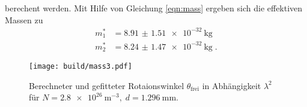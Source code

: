 berechent werden.
Mit Hilfe von Gleichung \eqref{eqn:mass} ergeben sich die effektiven Massen zu
\begin{align*}
    m^*_1&= \qty{8.91(151)e-32}{\kilo\gram} \\
    m^*_2&= \qty{8.24(147)e-32}{\kilo\gram} \; \text{.}
\end{align*} 
\begin{figure}
    \centering
    \texttt{[image: build/mass3.pdf]}
    \caption{Berechneter und gefitteter Rotaionswinkel $\theta_\text{frei}$ in Abhängigkeit $\lambda^2$ für $
    N=\qty{2.8e26}{\meter\tothe{-3}}, \; d = \qty{1,296}{\milli\meter}$.}
    \label{fig:mass3}
\end{figure}
